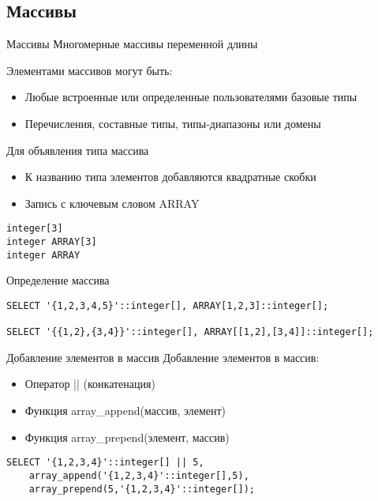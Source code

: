 \documentclass[12pt]{article}
\begin{document}
\newpage

\subsection{Массивы}

\begin{defin}{Массивы}
    Многомерные массивы переменной длины 

    Элементами массивов могут быть: 

    \begin{itemize}
        \item Любые встроенные или определенные пользователями базовые типы
        \item Перечисления, составные типы, типы-диапазоны или домены 
    \end{itemize}

    Для объявления типа массива 

    \begin{itemize}
        \item К названию типа элементов добавляются квадратные скобки 
        \item Запись с ключевым словом ARRAY
    \end{itemize}
\end{defin}

\begin{Example}{}
\begin{lstlisting}
integer[3]
integer ARRAY[3]
integer ARRAY 
\end{lstlisting}
\end{Example}

\begin{Example}{Определение массива}
\begin{lstlisting}
SELECT '{1,2,3,4,5}'::integer[], ARRAY[1,2,3]::integer[];

SELECT '{{1,2},{3,4}}'::integer[], ARRAY[[1,2],[3,4]]::integer[];
\end{lstlisting}
\end{Example}

\begin{Example}{Добавление элементов в массив}
    Добавление элементов в массив:

    \begin{itemize}
        \item Оператор || (конкатенация)
        \item Функция array\_append(массив, элемент)
        \item Функция array\_prepend(элемент, массив)
    \end{itemize}
\begin{lstlisting}
SELECT '{1,2,3,4}'::integer[] || 5,
    array_append('{1,2,3,4}'::integer[],5),
    array_prepend(5,'{1,2,3,4}'::integer[]);
\end{lstlisting}
\end{Example}
\end{document}
